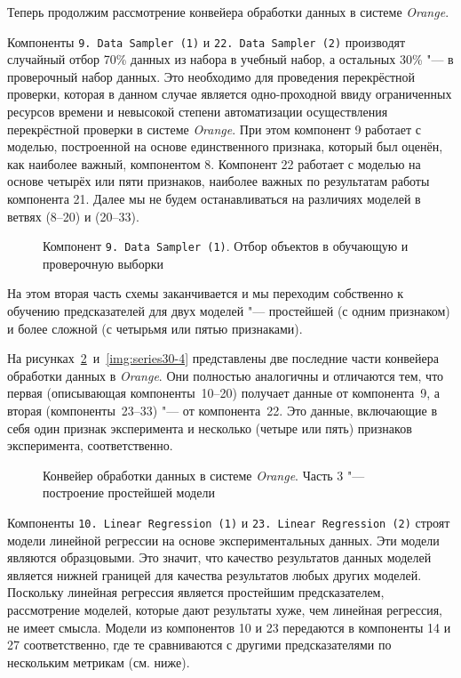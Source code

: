 Теперь продолжим рассмотрение конвейера обработки данных в системе \textit{Orange}.

Компоненты \texttt{9.\,Data~Sampler~(1)} и \texttt{22.\,Data~Sampler~(2)} производят случайный отбор 70\% данных из набора в учебный набор, а остальных 30\% "--- в проверочный набор данных. Это необходимо для проведения перекрёстной проверки, которая в данном случае является одно-проходной ввиду ограниченных ресурсов времени и невысокой степени автоматизации осуществления перекрёстной проверки в системе \textit{Orange}. При этом компонент 9 работает с моделью, построенной на основе единственного признака, который был оценён, как наиболее важный, компонентом 8. Компонент 22 работает с моделью на основе четырёх или пяти признаков, наиболее важных по результатам работы компонента 21. Далее мы не будем останавливаться на различиях моделей в ветвях (8--20) и (20--33).

\begin{figure}[tbp]
    \caption{Компонент \texttt{9.\,Data~Sampler~(1)}. Отбор объектов в обучающую и проверочную выборки}
    \label{img:9-Data-Sampler-1}
\end{figure}

На этом вторая часть схемы заканчивается и мы переходим собственно к обучению предсказателей для двух моделей "--- простейшей (с одним признаком) и более сложной (с четырьмя или пятью признаками).

На рисунках~\ref{img:series30-3}~и~\ref{img:series30-4} представлены две последние части конвейера обработки данных в \textit{Orange}. Они полностью аналогичны и отличаются тем, что первая (описывающая компоненты~10--20) получает данные от компонента~9, а вторая (компоненты~23--33) "--- от компонента~22. Это данные, включающие в себя один признак эксперимента и несколько (четыре или пять) признаков эксперимента, соответственно.

\begin{figure}[tbp]
    \caption{Конвейер обработки данных в системе \textit{Orange}. Часть 3 "--- построение простейшей модели}
    \label{img:series30-3}
\end{figure}

Компоненты \texttt{10.\,Linear~Regression~(1)} и \texttt{23.\,Linear~Regression~(2)} строят модели линейной регрессии на основе экспериментальных данных. Эти модели являются образцовыми. Это значит, что качество результатов данных моделей является нижней границей для качества результатов любых других моделей. Поскольку линейная регрессия является простейшим предсказателем, рассмотрение моделей, которые дают результаты хуже, чем линейная регрессия, не имеет смысла. Модели из компонентов 10 и 23 передаются в компоненты 14 и 27 соответственно, где те сравниваются с другими предсказателями по нескольким метрикам (см. ниже).


